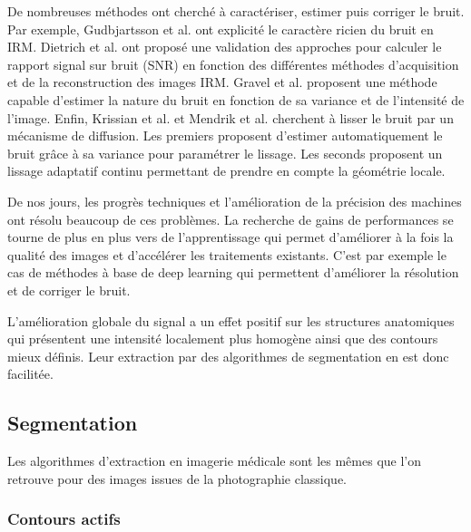     De nombreuses méthodes ont cherché à caractériser, estimer puis corriger le bruit. Par exemple, Gudbjartsson et al. \cite{Gudbjartsson1995r_Rician_noise_MRI} ont explicité le caractère ricien du bruit en IRM. Dietrich et al. \cite{Dietrich2007_measurement_MR_noise} ont proposé une validation des approches pour calculer le rapport signal sur bruit (SNR) en fonction des différentes méthodes d'acquisition et de la reconstruction des images IRM. Gravel et al. \cite{Gravel_2004_estimate_noise_medical_img} proposent une méthode capable d'estimer la nature du bruit en fonction de sa variance et de l'intensité de l'image. Enfin, Krissian et al. \cite{Krissian_2009_diffusion_MRI} et Mendrik et al. \cite{Mendrik2009_HDCS} cherchent à lisser le bruit par un mécanisme de diffusion. Les premiers proposent d'estimer automatiquement le bruit grâce à sa variance pour paramétrer le lissage. Les seconds proposent un lissage adaptatif continu permettant de prendre en compte la géométrie locale.    
    
    De nos jours, les progrès techniques et l'amélioration de la précision des machines ont résolu beaucoup de ces problèmes. La recherche de gains de performances se tourne de plus en plus vers de l'apprentissage qui permet d'améliorer à la fois la qualité des images et d'accélérer les traitements existants. C'est par exemple le cas de méthodes à base de deep learning \cite{Higaki2019_deep_MRI_CT_quality} qui permettent d'améliorer la résolution et de corriger le bruit.

    L'amélioration globale du signal a un effet positif sur les structures anatomiques qui présentent une intensité localement plus homogène ainsi que des contours mieux définis. Leur extraction par des algorithmes de segmentation en est donc facilitée.
    \subsection{Segmentation}
      Les algorithmes d'extraction en imagerie médicale sont les mêmes que l'on retrouve pour des images issues de la photographie classique. 
      \subsubsection{Contours actifs}
